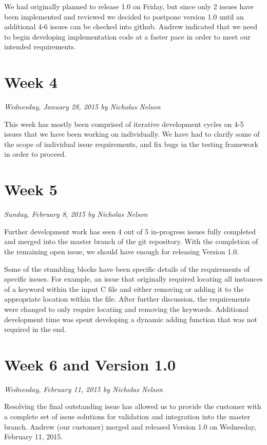 \documentclass[11pt]{scrreprt}
\begin{document}
We had originally planned to release 1.0 on Friday, but since only 2 issues have been implemented and reviewed we decided to postpone version 1.0 until an additional 4-6 issues can be checked into github. Andrew indicated that we need to begin developing implementation code at a faster pace in order to meet our intended requirements.

\section{Week 4}
\textit{Wednesday, January 28, 2015 by Nicholas Nelson}
\newline

This week has mostly been comprised of iterative development cycles on 4-5 issues that we have been working on individually. We have had to clarify some of the scope of individual issue requirements, and fix bugs in the testing framework in order to proceed.

\section{Week 5}
\textit{Sunday, February 8, 2015 by Nicholas Nelson}
\newline

Further development work has seen 4 out of 5 in-progress issues fully completed and merged into the master branch of the git repository. With the completion of the remaining open issue, we should have enough for releasing Version 1.0.

Some of the stumbling blocks have been specific details of the requirements of specific issues. For example, an issue that originally required locating all instances of a keyword within the input C file and either removing or adding it to the appropriate location within the file. After further discussion, the requirements were changed to only require locating and removing the keywords. Additional development time was spent developing a dynamic adding function that was not required in the end.

\section{Week 6 and Version 1.0}
\textit{Wednesday, February 11, 2015 by Nicholas Nelson}
\newline

Resolving the final outstanding issue has allowed us to provide the customer with a complete set of issue solutions for validation and integration into the master branch. Andrew (our customer) merged and released Version 1.0 on Wednesday, February 11, 2015.
\end{document}
